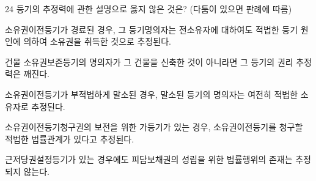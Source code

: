 \begin{question}{24}
등기의 추정력에 관한 설명으로 옳지 않은 것은? (다툼이 있으면 판례에 따름)
\begin{choices}
  \item 소유권이전등기가 경료된 경우, 그 등기명의자는 전소유자에 대하여도 적법한 등기 원인에 의하여 소유권을 취득한 것으로 추정된다.
  \item 건물 소유권보존등기의 명의자가 그 건물을 신축한 것이 아니라면 그 등기의 권리 추정력은 깨진다.
  \item 소유권이전등기가 부적법하게 말소된 경우, 말소된 등기의 명의자는 여전히 적법한 소유자로 추정된다.
  \item 소유권이전등기청구권의 보전을 위한 가등기가 있는 경우, 소유권이전등기를 청구할 적법한 법률관계가 있다고 추정된다.
  \item 근저당권설정등기가 있는 경우에도 피담보채권의 성립을 위한 법률행위의 존재는 추정되지 않는다.
\end{choices}
\end{question}
